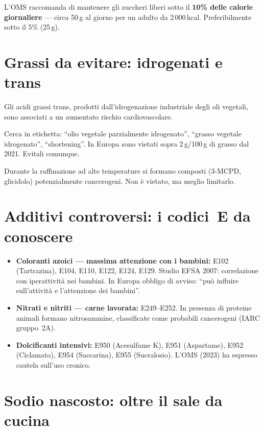\documentclass[a5paper,12pt,oneside,openany]{book}
\newcommand{\boxgiallo}[2]{%
  \begin{tcolorbox}[boxbase,
    colback=giallo!12!white, colframe=giallo!80!black, title={#1}]
  #2\end{tcolorbox}}
\newcommand{\boxrosso}[2]{%
  \begin{tcolorbox}[boxbase,
    colback=rosso!8!white, colframe=rosso, title={#1}]
  #2\end{tcolorbox}}
\begin{document}
L'OMS raccomanda di mantenere gli zuccheri liberi sotto il \textbf{10\%
delle calorie giornaliere} --- circa 50\,g al giorno per un adulto da
2\,000\,kcal. Preferibilmente sotto il 5\% (25\,g).

\section{Grassi da evitare: idrogenati e trans}

Gli acidi grassi trans, prodotti dall'idrogenazione industriale degli oli
vegetali, sono associati a un aumentato rischio cardiovascolare.

\boxrosso{Grassi idrogenati e parzialmente idrogenati}{Cerca in etichetta:
``olio vegetale parzialmente idrogenato'', ``grasso vegetale idrogenato'',
``shortening''. In Europa sono vietati sopra 2\,g/100\,g di grasso dal
2021. Evitali comunque.}

\boxgiallo{Olio di palma: non è trans, ma\ldots}{Durante la raffinazione
ad alte temperature si formano composti (3-MCPD, glicidolo) potenzialmente
cancerogeni. Non è vietato, ma meglio limitarlo.}

\section{Additivi controversi: i codici~E da conoscere}

\begin{itemize}
  \item \textbf{Coloranti azoici --- massima attenzione con i bambini:}
    E102 (Tartrazina), E104, E110, E122, E124, E129. Studio EFSA 2007:
    correlazione con iperattività nei bambini. In Europa obbligo di avviso:
    ``può influire sull'attività e l'attenzione dei bambini''.
  \item \textbf{Nitrati e nitriti --- carne lavorata:} E249--E252. In
    presenza di proteine animali formano nitrosammine, classificate come
    probabili cancerogeni (IARC gruppo~2A).
  \item \textbf{Dolcificanti intensivi:} E950 (Acesulfame K), E951
    (Aspartame), E952 (Ciclamato), E954 (Saccarina), E955 (Sucralosio).
    L'OMS (2023) ha espresso cautela sull'uso cronico.
\end{itemize}

\section{Sodio nascosto: oltre il sale da cucina}
\end{document}
